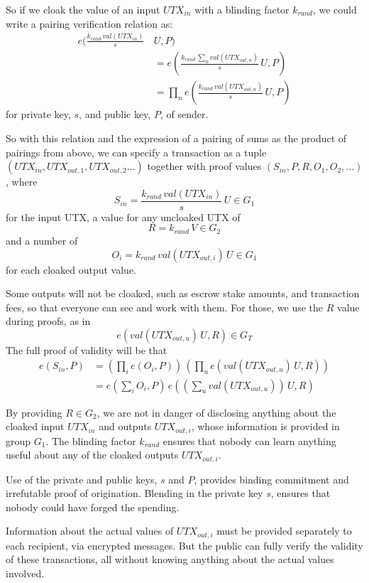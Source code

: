 \documentclass{yellowpaper}
\begin{document}
So if we cloak the value of an input $UTX_{in}$ with a blinding factor $k_{rand}$, we could write a pairing verification relation as:
$$
\begin{align}
e(\frac {k_{rand} \, val(UTX_{in})}{s}\, & U, P) \\
& = e(\frac{k_{rand} \, \sum_n val(UTX_{out,n})}{s} \, U, P) \\
& = \prod_n e(\frac{k_{rand} \, val(UTX_{out,n})}{s} \, U, P)
\end{align}
$$
for private key, $s$, and public key, $P$,  of sender.

So with this relation and the expression of a pairing of sums as the product of pairings from above, we can specify a transaction as a tuple $(UTX_{in}, UTX_{out,1}, UTX_{out,2}...)$ together with proof values $(S_{in}, P, R, O_1, O_2, ...)$, where
$$ S_{in} = \frac{k_{rand} \, val(UTX_{in})}{s}\, U \in G_1$$
for the input UTX, a value for any uncloaked UTX of
$$ R = k_{rand} \, V \in G_2$$
and a number of
$$ O_i = k_{rand} \, val(UTX_{out,i}) \, U \in G_1$$
for each cloaked output value. 

Some outputs will not be cloaked, such as escrow stake amounts, and transaction fees, so that everyone can see and work with them. For those, we use the $R$ value during proofs, as in
$$ e(val(UTX_{out,u}) \, U, R) \in G_T$$
The full proof of validity will be that
$$
\begin{align}
e(S_{in},P) &= (\prod_i e(O_i, P)) \, (\prod_u e(val(UTX_{out,u})\, U, R)) \\
&= e(\sum_i O_i, P) \, e((\sum_u val(UTX_{out,u})) \, U, R)
\end{align}
$$

By providing $R \in G_2$, we are not in danger of disclosing anything about the cloaked input $UTX_{in}$ and outputs $UTX_{out,i}$, whose information is provided in group $G_1$. The blinding factor $k_{rand}$ ensures that nobody can learn anything useful about any of the cloaked outputs $UTX_{out,i}$. 

Use of the private and public keys, $s$ and $P$, provides binding commitment and irrefutable proof of origination. Blending in the private key $s$, ensures that nobody could have forged the spending.

Information about the actual values of $UTX_{out,i}$ must be provided separately to each recipient, via encrypted messages. But the public can fully verify the validity of these transactions, all without knowing anything about the actual values involved.
\end{document}
